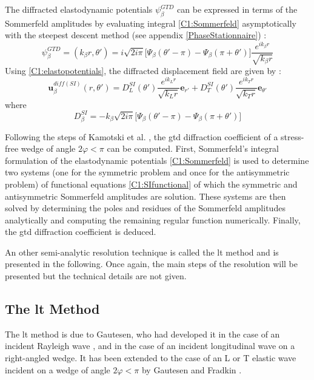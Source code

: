 The diffracted elastodynamic potentials $\psi_{\beta}^{GTD} $ can be expressed in terms of the Sommerfeld amplitudes by evaluating integral \eqref{C1:Sommerfeld} asymptotically with the steepest descent method (see appendix \ref{PhaseStationnaire}) :
\begin{equation}
\psi_{\beta}^{GTD}=(k_{\beta} r,\theta')=i\sqrt{2i\pi}\lbrack \Psi_{\beta}(\theta'-\pi)-\Psi_{\beta}(\pi+\theta')\rbrack \dfrac{e^{ik_{\beta}r}}{\sqrt{k_{\beta}r}}
\end{equation}
Using \eqref{C1:elastopotentials}, the diffracted displacement field are given by :
\begin{equation}
\mathbf{u}_{\beta}^{diff(SI)}(r,\theta')=D_L^{SI}(\theta')\dfrac{e^{ik_Lr}}{\sqrt{k_Lr}}\mathbf{e}_{r'}+D_T^{SI}(\theta')\dfrac{e^{ik_Tr}}{\sqrt{k_Tr}}\mathbf{e}_{\theta'}
\end{equation}
where
\begin{equation}
D_{\beta}^{SI}=-k_{\beta}\sqrt{2i\pi}\lbrack \Psi_{\beta}(\theta'-\pi)-\Psi_{\beta}(\pi+\theta')\rbrack
\end{equation}

Following the steps of Kamotski et al. \cite{KamotskiFradkin}, the \acrshort{gtd} diffraction coefficient of a stress-free wedge of angle $2\varphi<\pi$ can be computed. First, Sommerfeld's integral formulation of the elastodynamic potentials \eqref{C1:Sommerfeld} is used to determine two systems (one for the symmetric problem and once for the antisymmetric problem) of functional equations \eqref{C1:SIfunctional} of which the symmetric and antisymmetric Sommerfeld amplitudes are solution. These systems are then solved by determining the poles and residues of the Sommerfeld amplitudes analytically and computing the remaining regular function numerically. Finally, the \acrshort{gtd} diffraction coefficient is deduced. 

An other semi-analytic resolution technique is called the \acrfull{lt} method and is presented in the following. Once again, the main steps of the resolution will be presented but the technical details are not given.

\subsection{The \acrfull{lt} Method}
The \acrfull{lt} method is due to Gautesen, who had developed it in the case of an incident Rayleigh wave \cite{GautesenRayleigh,GautesenRayleigh2,GautesenRayleigh0,GautesenRayleigh3,GautesenRayleigh4}, and in the case of an incident longitudinal wave on a right-angled wedge\cite{GautesenLwave}. It has been extended to the case of an L or T elastic wave incident on a wedge of angle $2\varphi<\pi$ by Gautesen and Fradkin \cite{GautesenFradkin}.

